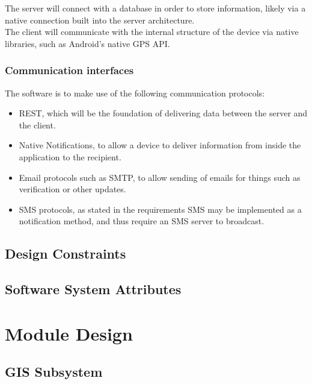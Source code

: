 \documentclass{article}
\begin{document}
			The server will connect with a database in order to store information, likely via a native connection built into the server architecture.\\
			
			The client will communicate with the internal structure of the device via native libraries, such as Android's native GPS API.
			
			\subsubsection{Communication interfaces}
			
			The software is to make use of the following communication protocols:
			
				\begin{itemize}
					\item REST, which will be the foundation of delivering data between the server and the client.
					\item Native Notifications, to allow a device to deliver information from inside the application to the recipient.
					\item Email protocols such as SMTP, to allow sending of emails for things such as verification or other updates.
					\item SMS protocols, as stated in the requirements SMS may be implemented as a notification method, and thus require an SMS server to broadcast.
				\end{itemize}
		
		\pagebreak
		
		\subsection{Design Constraints}
		
		\subsection{Software System Attributes}
	
	\pagebreak
	
	\section{Module Design}
	
		\subsection{GIS Subsystem}
\end{document}
